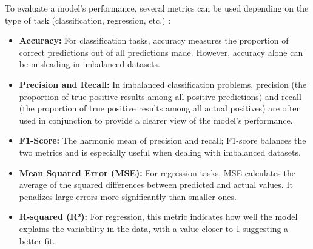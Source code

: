 To evaluate a model’s performance, several metrics can be used depending on the type of task (classification, regression, etc.) \parencite{ketkar2017deep}:
\begin{itemize}
    \item \textbf{Accuracy:} For classification tasks, accuracy measures the proportion of correct predictions out of all predictions made. However, accuracy alone can be misleading in imbalanced datasets.
    \item \textbf{Precision and Recall:} In imbalanced classification problems, precision (the proportion of true positive results among all positive predictions) and recall (the proportion of true positive results among all actual positives) are often used in conjunction to provide a clearer view of the model's performance.
    \item \textbf{F1-Score:} The harmonic mean of precision and recall; F1-score balances the two metrics and is especially useful when dealing with imbalanced datasets.
    \item \textbf{Mean Squared Error (MSE):} For regression tasks, MSE calculates the average of the squared differences between predicted and actual values. It penalizes large errors more significantly than smaller ones.
    \item \textbf{R-squared (R²):} For regression, this metric indicates how well the model explains the variability in the data, with a value closer to 1 suggesting a better fit.
\end{itemize}




    
